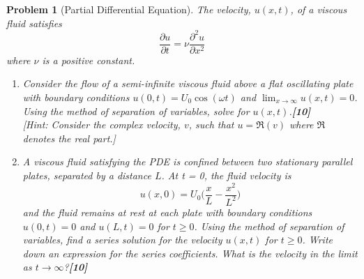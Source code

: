\documentclass[a4paper]{article}
\theoremstyle{new}
\newtheorem{qns}{Problem}[section]
\begin{document}
\newpage
\begin{qns}[Partial Differential Equation]
The velocity, $u(x, t)$, of a viscous fluid satisfies
\begin{equation}
\frac{\partial u}{\partial t}=\nu\frac{\partial^2u}{\partial x^2}\tag{*}
\end{equation}
where $\nu$ is a positive constant.
\begin{enumerate}[label=(\roman*)]
    \item Consider the flow of a semi-infinite viscous fluid above a flat oscillating plate with boundary conditions $u(0,t)=U_0\cos(\omega t)$ and $\lim_{x\rightarrow\infty}u(x,t)=0$. Using the method of separation of variables, solve for $u(x, t)$.\hfill \textbf{[10]}\\[5pt]
[Hint: Consider the complex velocity, $v$, such that $u = \Re(v)$ where $\Re$ denotes the real part.]
\item  A viscous fluid satisfying the PDE is confined between two stationary parallel plates, separated by a distance $L$. At t = 0, the fluid velocity is
$$u(x,0)=U_0\bigg(\frac{x}{L}-\frac{x^2}{L^2}\bigg)$$
and the fluid remains at rest at each plate with boundary conditions $u(0,t)=0$ and $u(L,t)=0$ for $t\geq0$. Using the method of separation of variables, find a series solution for the velocity $u(x, t)$ for $t\geq0$. Write down an expression for the series coefficients. What is the velocity in the limit as $t\rightarrow\infty$?\hfill \textbf{[10]}
\end{enumerate}
\end{qns}
\end{document}

